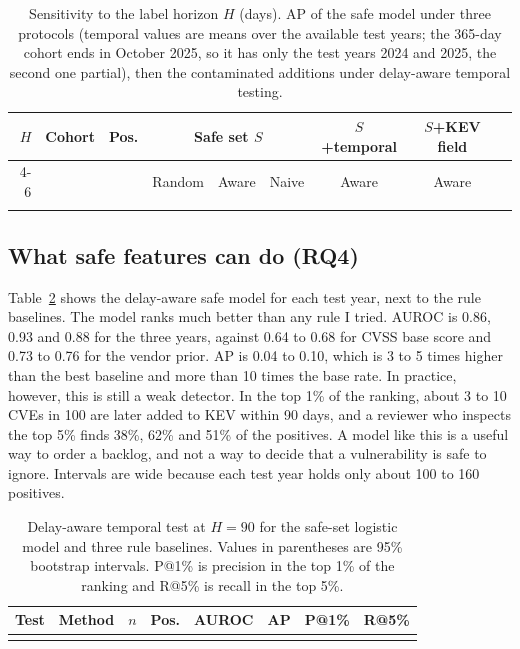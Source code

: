 \documentclass[11pt,a4paper]{article}
\begin{document}
\begin{table}[t]
\centering
\caption{Sensitivity to the label horizon $H$ (days). AP of the safe model under three protocols (temporal values are means over the available test years; the 365-day cohort ends in October 2025, so it has only the test years 2024 and 2025, the second one partial), then the contaminated additions under delay-aware temporal testing.}
\label{tab:h}
\small
\begin{tabular}{rrrcccccc}
\toprule
$H$ & Cohort & Pos. & \multicolumn{3}{c}{Safe set $S$} & $S$+temporal & $S$+KEV field\\
\cmidrule(lr){4-6}
 & & & Random & Aware & Naive & Aware & Aware \\
\midrule
\\
\bottomrule
\end{tabular}
\end{table}

\subsection{What safe features can do (RQ4)}

Table~\ref{tab:year} shows the delay-aware safe model for each test year, next to the rule baselines. The model ranks much better than any rule I tried. AUROC is 0.86, 0.93 and 0.88 for the three years, against 0.64 to 0.68 for CVSS base score and 0.73 to 0.76 for the vendor prior. AP is 0.04 to 0.10, which is 3 to 5 times higher than the best baseline and more than 10 times the base rate. In practice, however, this is still a weak detector. In the top 1\% of the ranking, about 3 to 10 CVEs in 100 are later added to KEV within 90 days, and a reviewer who inspects the top 5\% finds 38\%, 62\% and 51\% of the positives. A model like this is a useful way to order a backlog, and not a way to decide that a vulnerability is safe to ignore. Intervals are wide because each test year holds only about 100 to 160 positives.

\begin{table}[t]
\centering
\caption{Delay-aware temporal test at $H=90$ for the safe-set logistic model and three rule baselines. Values in parentheses are 95\% bootstrap intervals. P@1\% is precision in the top 1\% of the ranking and R@5\% is recall in the top 5\%.}
\label{tab:year}
\footnotesize
\begin{tabular}{llrrccrr}
\toprule
Test & Method & $n$ & Pos. & AUROC & AP & P@1\% & R@5\% \\
\midrule
\\
\bottomrule
\end{tabular}
\end{table}
\end{document}

